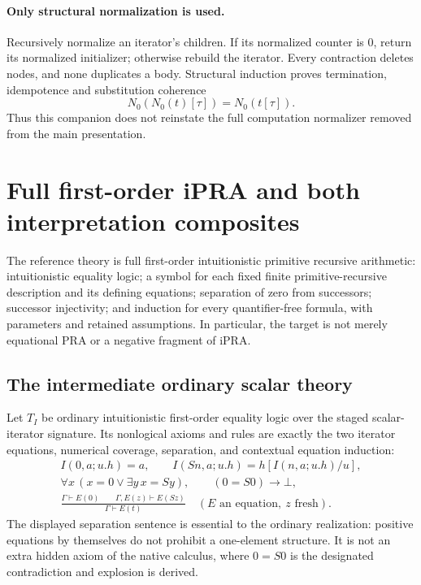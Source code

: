 \paragraph{Only structural normalization is used.}
Recursively normalize an iterator's children. If its normalized counter is
$0$, return its normalized initializer; otherwise rebuild the iterator.
Every contraction deletes nodes, and none duplicates a body. Structural
induction proves termination, idempotence and substitution coherence
\[
              N_0(N_0(t)[\tau])=N_0(t[\tau]).
\]
Thus this companion does not reinstate the full computation normalizer
removed from the main presentation.

\section{Full first-order iPRA and both interpretation composites}
\label{sec:interpretations}

The reference theory is full first-order intuitionistic primitive recursive
arithmetic: intuitionistic equality logic; a symbol for each fixed finite
primitive-recursive description and its defining equations; separation of
zero from successors; successor injectivity; and induction for every
quantifier-free formula, with parameters and retained assumptions.
In particular, the target is not merely equational PRA or a negative
fragment of iPRA.

\subsection{The intermediate ordinary scalar theory}

Let $T_I$ be ordinary intuitionistic first-order equality logic over the
staged scalar-iterator signature. Its nonlogical axioms and rules are exactly
the two iterator equations, numerical coverage, separation, and contextual
equation induction:
\begin{gather*}
 I(0,a;u.h)=a,\qquad I(Sn,a;u.h)=h[I(n,a;u.h)/u],\\
 \forall x\,(x=0\vee\exists y\,x=Sy),\qquad (0=S0)\to\bot,\\
 \frac{\Gamma\vdash E(0)\qquad\Gamma,E(z)\vdash E(Sz)}
      {\Gamma\vdash E(t)}\quad(E\text{ an equation},\ z\text{ fresh}).
\end{gather*}
The displayed separation sentence is essential to the ordinary realization:
positive equations by themselves do not prohibit a one-element structure.
It is not an extra hidden axiom of the native calculus, where $0=S0$ is
the designated contradiction and explosion is derived.


